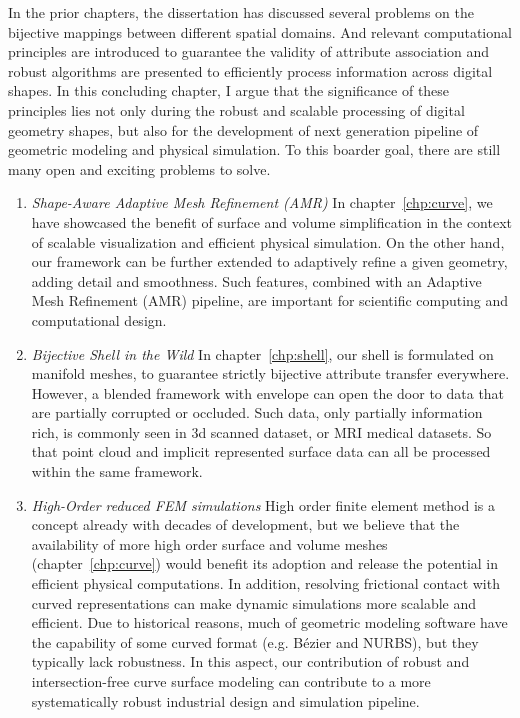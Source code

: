 In the prior chapters, the dissertation has discussed several problems on the bijective mappings between different spatial domains.
And relevant computational principles are introduced to guarantee the validity of attribute association and robust algorithms are presented to efficiently process information across digital shapes. 
In this concluding chapter, I argue that the significance of these principles lies not only during the robust and scalable processing of digital geometry shapes, but also for the development of next generation pipeline of geometric modeling and physical simulation. 
To this boarder goal, there are still many open and exciting problems to solve.

\begin{enumerate}
  \item \emph{Shape-Aware Adaptive Mesh Refinement (AMR)}
In chapter~\ref{chp:curve}, we have showcased the benefit of surface and volume simplification in the context of scalable visualization and efficient physical simulation. On the other hand, our framework can be further extended to adaptively refine a given geometry, adding detail and smoothness. Such features, combined with an Adaptive Mesh Refinement (AMR) pipeline, are important for scientific computing and computational design.

\item \emph{Bijective Shell in the Wild} %
In chapter~\ref{chp:shell}, our shell is formulated on manifold meshes, 
to guarantee strictly bijective attribute transfer everywhere.
However, a blended framework with envelope \cite{hu2018tetrahedral, Wang:2021} can open the door to  data that are partially corrupted or occluded. Such data, only partially information rich, is commonly seen in 3d scanned dataset, or MRI medical datasets.
So that point cloud and implicit represented surface data can all be processed within the same framework.

\item \emph{High-Order reduced FEM simulations}
High order finite element method is a concept already with decades of development, but we believe that the availability of more high order surface and volume meshes (chapter~\ref{chp:curve}) would benefit its adoption and release the potential in efficient physical computations. In addition, resolving frictional contact with curved representations \cite{ferguson2022high} can make dynamic simulations more scalable and efficient. 
Due to historical reasons, much of geometric modeling software have the capability of some curved format (e.g. B{\'e}zier and NURBS), but they typically lack robustness. In this aspect, our contribution of robust and intersection-free curve surface modeling can contribute to a more systematically robust industrial design and simulation pipeline.


\end{enumerate}
